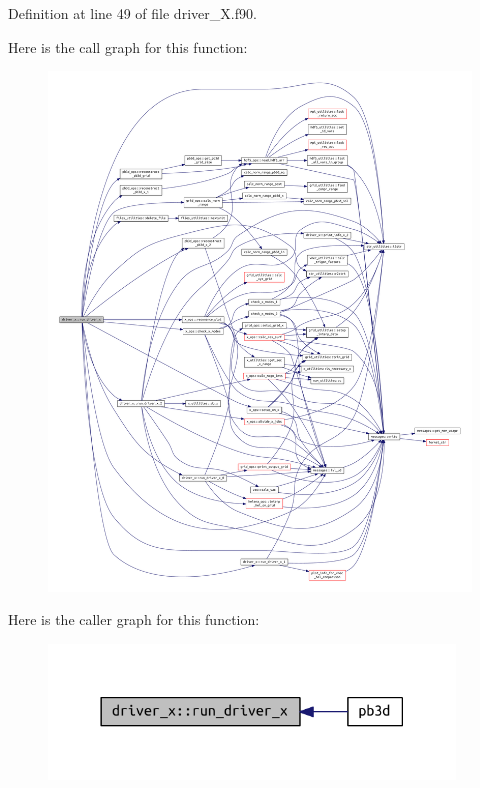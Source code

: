 Definition at line 49 of file driver\+\_\+\+X.\+f90.

Here is the call graph for this function\+:
\nopagebreak
\begin{figure}[H]
\begin{center}
\leavevmode
\includegraphics[width=350pt]{namespacedriver__x_ada3d72a0929daaa5e3da585246d62281_cgraph}
\end{center}
\end{figure}
Here is the caller graph for this function\+:
\nopagebreak
\begin{figure}[H]
\begin{center}
\leavevmode
\includegraphics[width=306pt]{namespacedriver__x_ada3d72a0929daaa5e3da585246d62281_icgraph}
\end{center}
\end{figure}
\mbox{\label{namespacedriver__x_a2b82a9bc6c0f4af9f3468d03fedc008e}} 
